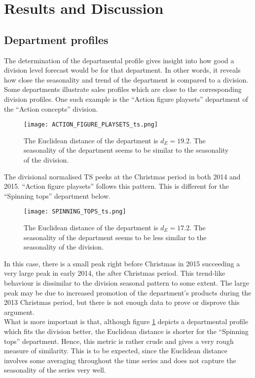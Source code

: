 \documentclass[11pt]{article}
\begin{document}
\section{Results and Discussion}
\subsection{Department profiles}
The determination of the departmental profile gives insight into how good a division level forecast would be for that department. In other words, it reveals how close the seasonality and trend of the department is compared to a division. Some departments illustrate sales profiles which are close to the corresponding division profiles. One such example is the ``Action figure playsets'' department of the ``Action concepts'' division.

\begin{figure}[ht]
\centering
\texttt{[image: ACTION\_FIGURE\_PLAYSETS\_ts.png]}
\caption{The Euclidean distance of the department is $d_E=19.2$. The seasonality of the department seems to be similar to the seasonality of the division.}
\label{11}
\end{figure}

The divisional normalised TS peeks at the Christmas period in both 2014 and 2015. ``Action figure playsets'' follows this pattern. This is different for the ``Spinning tops'' department below.

\begin{figure}[ht]
\centering
\texttt{[image: SPINNING\_TOPS\_ts.png]}
\caption{The Euclidean distance of the department is $d_E=17.2$. The seasonality of the department seems to be less similar to the seasonality of the division.}
\label{12}
\end{figure}

In this case, there is a small peak right before Christmas in 2015 succeeding a very large peak in early 2014, the after Christmas period. This trend-like behaviour is dissimilar to the division seasonal pattern to some extent. The large peak may be due to increased promotion of the department's products during the 2013 Christmas period, but there is not enough data to prove or disprove this argument.\\

What is more important is that, although figure \ref{11} depicts a departmental profile which fits the division better, the Euclidean distance is shorter for the ``Spinning tops'' department. Hence, this metric is rather crude and gives a very rough measure of similarity. This is to be expected, since the Euclidean distance involves some averaging throughout the time series and does not capture the seasonality of the series very well.\\
\end{document}
